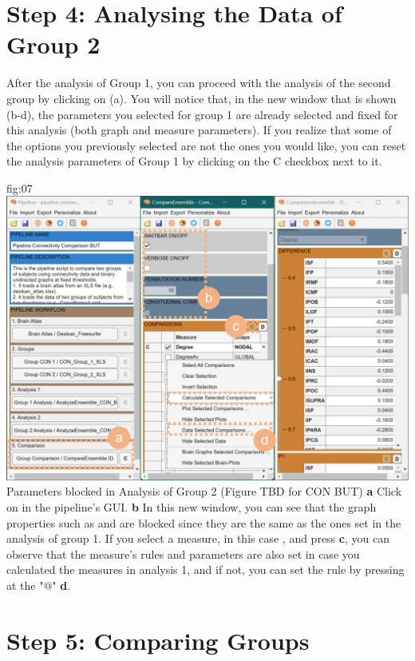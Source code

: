 \documentclass[justified]{tufte-handout}
\begin{document}
\section{Step 4: Analysing the Data of Group 2}

After the analysis of Group 1, you can proceed with the analysis of the second group by clicking on  (a). You will notice that, in the new window that is shown (b-d), the parameters you selected for group 1 are already selected and fixed for this analysis (both graph and measure parameters). If you realize that some of the options you previously selected are not the ones you would like, you can reset the analysis parameters of Group 1 by clicking on the C checkbox next to it.

	{fig:07}
	{
	\includegraphics{fig07.jpg}
	}
	{Parameters blocked in Analysis of Group 2 (Figure TBD for CON BUT)}
	{
	{\bf a} Click on  in the pipeline's GUI.
	{\bf b} In this new window, you can see that the graph properties such as  and  are blocked since they are the same as the ones set in the analysis of group 1. If you select a measure, in this case , and press  {\bf c}, you can observe that the measure's rules and parameters are also set in case you calculated the measures in analysis 1, and if not, you can set the rule by pressing at the "@" {\bf d}.
	}
 
\section{Step 5: Comparing Groups}
\end{document}
